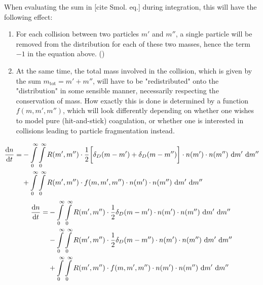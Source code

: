         When evaluating the sum in [cite Smol. eq.] during integration, this will have the following 
        effect:
        \begin{enumerate}
            \item For each collision between two particles $m'$ and $m''$, a single particle will 
                be removed from the distribution for each of these two masses, hence the term $-1$ 
                in the equation above. ()
            \item At the same time, the total mass involved in the collision, which is given by the 
                sum $m_\text{tot} = m' + m''$, will have to be "redistributed" onto the "distribution" 
                in some sensible manner, necessarily respecting the conservation of mass. How exactly 
                this is done is determined by a function $f(m,m',m'')$, which will look differently 
                depending on whether one wishes to model pure (hit-and-stick) coagulation, or
                whether one is interested in collisions leading to particle fragmentation instead.
        \end{enumerate}

        \begin{align}
            \frac{\text{d} n}{\text{d} t} =
            &-\int\limits_0^\infty \int\limits_0^\infty R(m',m'') \cdot 
                \frac{1}{2}\bigg[\delta_D(m-m')+\delta_D(m-m'')\bigg]
                \cdot n(m') \cdot n(m'') \ \text dm' \ \text dm'' \\
            &+\int\limits_0^\infty \int\limits_0^\infty R(m',m'') \cdot f(m,m',m'')
                \cdot n(m') \cdot n(m'') \ \text dm' \ \text dm'' 
        \end{align}
        \begin{align}
            \frac{\text{d} n}{\text{d} t} =
            &-\int\limits_0^\infty \int\limits_0^\infty R(m',m'') \cdot \frac{1}{2}\delta_D(m-m')
                \cdot n(m') \cdot n(m'') \ \text dm' \ \text dm'' \\
            &-\int\limits_0^\infty \int\limits_0^\infty R(m',m'') \cdot \frac{1}{2}\delta_D(m-m'')
                \cdot n(m') \cdot n(m'') \ \text dm' \ \text dm'' \\
            &+\int\limits_0^\infty \int\limits_0^\infty R(m',m'') \cdot f(m,m',m'')
                \cdot n(m') \cdot n(m'') \ \text dm' \ \text dm''
        \end{align}

